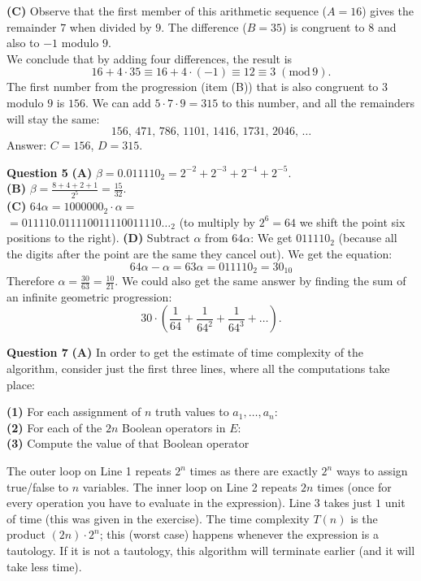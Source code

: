 \documentclass[jou]{apa6}
\begin{document}
{\bf (C)} Observe that the first member of this arithmetic sequence ($A = 16$) gives the
remainder $7$ when divided by $9$. The difference ($B = 35$) is congruent to $8$ and also to $-1$ 
modulo $9$.\\
We conclude that by adding four differences, the result is
$$16 + 4 \cdot 35 \equiv 16 + 4 \cdot (-1) \equiv 12 \equiv 3\;(\text{mod}\,9).$$
The first number from the progression (item (B)) that is also congruent to $3$ modulo $9$ is $156$. 
We can add $5 \cdot 7 \cdot 9 = 315$ to this number, and all the remainders will stay the same:
$$156,\,471,\,786,\,1101,\,1416,\,1731,\,2046,\,\ldots$$
Answer: $C = 156$, $D = 315$.

\vspace{10pt}
{\bf Question 5}
{\bf (A)} $\beta = 0.011110_2 = 2^{-2} + 2^{-3} + 2^{-4} + 2^{-5}$.\\
{\bf (B)} $\beta = \frac{8 + 4 + 2 + 1}{2^{5}} = \frac{15}{32}$.\\
{\bf (C)} $64\alpha = 1000000_2 \cdot \alpha =$\\
$= 011110.011110011110011110\ldots_2$ (to multiply 
by $2^6 = 64$ we shift the point six positions to the right).
{\bf (D)} Subtract $\alpha$ from $64\alpha$: We get $011110_2$ (because all the 
digits after the point are the same \textendash{} they cancel out). We get the equation:
$$64\alpha - \alpha = 63\alpha = 011110_2 = 30_{10}$$
Therefore $\alpha = \frac{30}{63} = \frac{10}{21}$. We could also get the
same answer by finding the sum of an infinite geometric progression: 
$$30 \cdot \left( \frac{1}{64} + \frac{1}{64^2} + \frac{1}{64^3} + \ldots{} \right).$$


\vspace{10pt}
{\bf Question 7} 
{\bf (A)} In order to get the estimate of time complexity of the algorithm, 
consider just the first three lines, where all the computations take place:

\vspace{3pt}
{\bf (1)} \hspace{0.0in} For each assignment of $n$ truth values to $a_1,\ldots,a_n$:\\
{\bf (2)} \hspace{0.2in} For each of the $2n$ Boolean operators in $E$:\\
{\bf (3)} \hspace{0.4in} Compute the value of that Boolean operator

\vspace{3pt}
The outer loop on Line 1 repeats $2^n$ times as there are exactly $2^n$ ways to assign true/false to 
$n$ variables. The inner loop on Line 2 repeats $2n$ times (once for every operation you have to evaluate
in the expression). Line 3 takes just $1$ unit of time (this was given in the exercise). 
The time complexity $T(n)$ is the product $(2n) \cdot 2^n$; this (worst case) happens
whenever the expression is a tautology. If it is not a tautology, this algorithm will terminate earlier 
(and it will take less time). 
\end{document}
